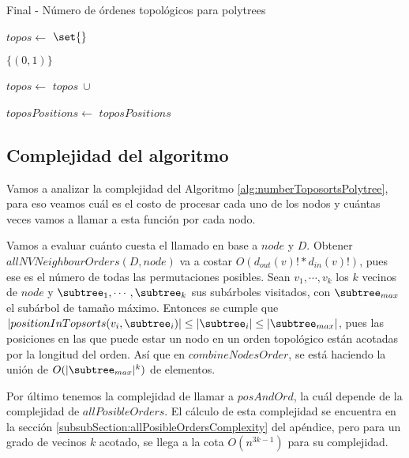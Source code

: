 \begin{algorithm}
\caption{Final - Número de órdenes topológicos para polytrees} \label{alg:numberToposortsPolytree}
\begin{algorithmic}[1]
    \State $topos \gets$ $\set{}$

            \State \Return $\{(0,1)\}$ %
    \EndIf
    
        \State $topos \gets$ $topos \ \cup$ 
    \EndFor

    \State $toposPositions \gets$ 
    \State \Return $toposPositions$
\EndFunction
\end{algorithmic}
\end{algorithm}
 

\subsection{Complejidad del algoritmo}
\label{subSection:polytreeCountingComplexity}

Vamos a analizar la complejidad del Algoritmo \ref{alg:numberToposortsPolytree}, para eso veamos cuál es el costo de procesar cada uno de los nodos y cuántas veces vamos a llamar a esta función por cada nodo. 

Vamos a evaluar cuánto cuesta el llamado en base a $node$ y $D$. Obtener $allNVNeighbourOrders(D,node)$ va a costar $O(d_{out}(v)!*d_{in}(v)!)$, pues ese es el número de todas las permutaciones posibles. Sean $v_1, \cdots, v_k$ los $k$ vecinos de $node$ y $\subtree_1, \cdots, \subtree_k$ sus subárboles visitados, con $\subtree_{max}$ el subárbol de tamaño máximo. Entonces se cumple que $|positionInTopsorts(v_i, \subtree_i)| \leq |\subtree_i| \leq |\subtree_{max}|$, pues las posiciones en las que puede estar un nodo en un orden topológico están acotadas por la longitud del orden. Así que en $combineNodesOrder$, se está haciendo la unión de $O(|\subtree_{max}|^k)$ de elementos. 

Por último tenemos la complejidad de llamar a $posAndOrd$, la cuál depende de la complejidad de $allPosibleOrders$. El cálculo de esta complejidad se encuentra en la sección \ref{subsubSection:allPosibleOrdersComplexity} del apéndice, pero para un grado de vecinos $k$ acotado, se llega a la cota $O(n^{3k-1})$ para su complejidad. 

